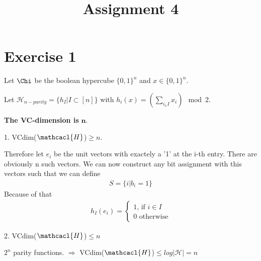 \documentclass{article}
\title{Assignment 4}
\begin{document}
\maketitle
\section*{Exercise 1}
Let $\Chi$ be the boolean hypercube $\{0,1\}^n$ and $x\in\{0,1\}^n$. 

Let $\mathcal{H}_{n-parity}=\{h_I|I\subset [n]\} $ with $h_i(x) =
(\sum_{i_\in I} x_i) \mod 2$.

\textbf{The VC-dimension is } $\mathbf{n}$.

1. VCdim($\mathcacl{H}$)$\geq n$.

Therefore let $e_i$ be the unit vectors with exactely a '1' at the i-th entry.
There are obviously n such vectors. We can now construct any bit assignment with
this vectors such that we can define 
\begin{align*}
S = \{ i| b_i = 1\}
\end{align*}
Because of that 
\begin{align*}
h_I(e_i) = \begin{cases}
1 \text{, if }i\in I\\
0 \text{ otherwise}
\end{cases}
\end{align*}

2. VCdim($\mathcacl{H}$)$\leq n$ 

$2^n$ parity functions. $\Rightarrow$ VCdim($\mathcacl{H}$)$\leq
log|\mathcal{H}| = n$
\end{document}
